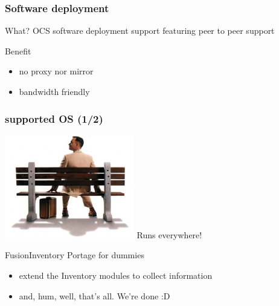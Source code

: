 \begin{frame}
    \frametitle{Software deployment}

    \begin{block}{What?}
    OCS software deployment support featuring peer to peer support
    \end{block}

    \begin{block}{Benefit}
    \begin{itemize}
        \item no proxy nor mirror
        \item bandwidth friendly
    \end{itemize}
    \end{block}
\end{frame}

\begin{frame}
    \frametitle{supported OS (1/2)}

    \includegraphics[height=4.5cm]{pics/forrest.jpg}
    Runs everywhere!

    \pause

    \begin{block}{FusionInventory Portage for dummies}
        \begin{itemize}
            \item extend the Inventory modules to collect information
            \item and, hum, well, that's all. We're done :D
        \end{itemize}
    \end{block}
\end{frame}

